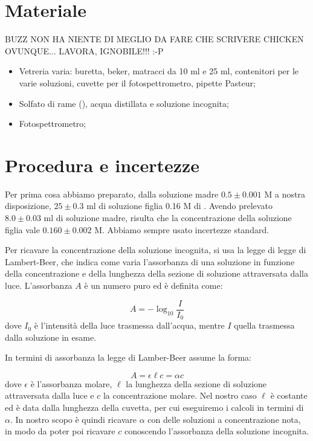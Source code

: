 \section*{Materiale}

BUZZ NON HA NIENTE DI MEGLIO DA FARE CHE SCRIVERE CHICKEN OVUNQUE... LAVORA, IGNOBILE!!! :-P

\begin{itemize}
        \setlength{\parskip}{-1pt}
        \item{Vetreria varia: buretta, beker, matracci da 10 ml e 25 ml,
            contenitori per le varie soluzioni, cuvette per il fotospettrometro,
            pipette Pasteur;}
        \item{Solfato di rame (), acqua distillata e soluzione incognita;}
        \item{Fotospettrometro;}
\end{itemize}

\section*{Procedura e incertezze}

Per prima cosa abbiamo preparato, dalla soluzione madre $0.5 \pm 0.001$ M a
nostra disposizione, $25 \pm 0.3$ ml di soluzione figlia 0.16 M
di . Avendo prelevato $8.0 \pm 0.03$ ml di soluzione madre, risulta che
la concentrazione della soluzione figlia vale $0.160 \pm 0.002 $ M. Abbiamo sempre
usato incertezze standard.

Per ricavare la concentrazione della soluzione incognita, si usa la legge di legge
di Lambert-Beer, che indica come varia l'assorbanza di una soluzione in funzione
della concentrazione e della lunghezza della sezione di soluzione attraversata dalla luce.
L'assorbanza $A$ è un numero puro ed è definita come:

\begin{equation}
    A = - \log_{10}{\frac{I}{I_0}}
\end{equation}
%
dove $I_0$ è l'intensità della luce trasmessa dall'acqua, mentre $I$ quella trasmessa
dalla soluzione in esame.

In termini di assorbanza la legge di Lamber-Beer assume la forma:

\begin{equation}
    A = \epsilon \ell c = \alpha c
\end{equation}
%
dove $\epsilon$ è l'assorbanza molare, $\ell$ la lunghezza della sezione di soluzione
attraversata dalla luce e $c$ la concentrazione molare. Nel nostro caso $\ell$ è costante
ed è data dalla lunghezza della cuvetta, per cui eseguiremo i calcoli in termini di
$\alpha$. In nostro scopo è quindi ricavare $\alpha$ con delle soluzioni a concentrazione
nota, in modo da poter poi ricavare $c$ conoscendo l'assorbanza della soluzione
incognita.

